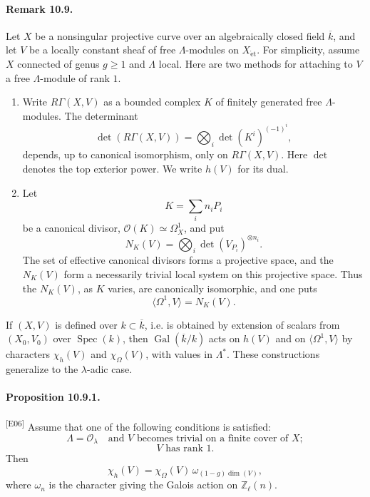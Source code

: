 \documentclass[10pt,letterpaper]{article}
\newcommand{\Z}{\mathbb Z}
\newcommand{\Gal}{\operatorname{Gal}}
\newcommand{\Spec}{\operatorname{Spec}}
\providecommand{\Spec}{\operatorname{Spec}}
\providecommand{\Gal}{\operatorname{Gal}}
\providecommand{\Gal}{\operatorname{Gal}}
\providecommand{\Spec}{\operatorname{Spec}}
\providecommand{\Spec}{\operatorname{Spec}}
\providecommand{\Gal}{\operatorname{Gal}}
\providecommand{\Gal}{\operatorname{Gal}}
\newcommand{\auditmark}[1]{\textsuperscript{\normalfont\scriptsize[E#1]}}
\begin{document}
\paragraph{Remark 10.9.} Let \(X\) be a nonsingular projective curve over an algebraically closed field \(\overline k\), and let \(V\) be a locally constant sheaf of free \(\Lambda\)-modules on \(X_{\mathrm{\acute et}}\). For simplicity, assume \(X\) connected of genus \(g\ge1\) and \(\Lambda\) local. Here are two methods for attaching to \(V\) a free \(\Lambda\)-module of rank \(1\).

\begin{enumerate}[label=(\alph*)]
\item Write \(R\Gamma(X,V)\) as a bounded complex \(K\) of finitely generated free \(\Lambda\)-modules. The determinant
\[
\det(R\Gamma(X,V))=
\bigotimes_i \det(K^i)^{(-1)^i},
\]
depends, up to canonical isomorphism, only on \(R\Gamma(X,V)\). Here \(\det\) denotes the top exterior power. We write \(h(V)\) for its dual.

\item Let
\[
K=\sum_i n_iP_i
\]
be a canonical divisor, \(\mathcal O(K)\simeq\Omega_X^1\), and put
\[
N_K(V)=\bigotimes_i \det(V_{P_i})^{\otimes n_i}.
\]
The set of effective canonical divisors forms a projective space, and the \(N_K(V)\) form a necessarily trivial local system on this projective space. Thus the \(N_K(V)\), as \(K\) varies, are canonically isomorphic, and one puts
\[
\langle\Omega^1,V\rangle=N_K(V).
\]
\end{enumerate}

If \((X,V)\) is defined over \(k\subset\overline k\), i.e. is obtained by extension of scalars from \((X_0,V_0)\) over \(\Spec(k)\), then \(\Gal(\overline k/k)\) acts on \(h(V)\) and on \(\langle\Omega^1,V\rangle\) by characters \(\chi_h(V)\) and \(\chi_{\Omega}(V)\), with values in \(\Lambda^*\). These constructions generalize to the \(\lambda\)-adic case.

\paragraph{Proposition 10.9.1.}\auditmark{06} Assume that one of the following conditions is satisfied:
\[
\tag{a}
\Lambda=\mathcal O_\lambda\quad\text{and }V\text{ becomes trivial on a finite cover of }X;
\]
\[
\tag{b}
V\text{ has rank }1.
\]
Then
\[
\tag{10.9.1}
\chi_h(V)=\chi_{\Omega}(V)\,\omega_{(1-g)\dim(V)},
\]
where \(\omega_n\) is the character giving the Galois action on \(\Z_\ell(n)\).
\end{document}
